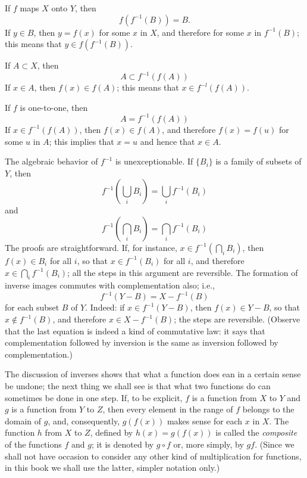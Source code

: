 If $f$ maps $X$ onto $Y$, then 
\begin{equation*} 
f(f^{-1}(B)) = B.
\end{equation*}
 If $y \in B$, then $y = f(x)$ for some $x$ in $X$, and therefore for some $x$ in $f^{-1}(B)$; this means that $y \in f(f^{-1}(B))$. 

If $A \subset X$, then 
\begin{equation*}
A \subset f^{-1}(f(A))
\end{equation*}
 If $x \in A$, then $f(x) \in f(A)$; this means that $x \in f^{-l}(f(A))$.

If $f$ is one-to-one, then 
\begin{equation*}
A = f^{-1}(f(A))
\end{equation*}
 If $x \in f^{-1}(f(A))$, then $f(x) \in f(A)$, and therefore $f(x) = f(u)$ for some $u$ in $A$; this implies that $x = u$ and hence that $x \in A$. 


The algebraic behavior of $f^{-1}$ is unexceptionable. If $ \{ B_{i} \} $ is a family of subsets of $Y$, then 
\begin{equation*}
f^{-1}( \bigcup_{i} B_{i} ) = \bigcup_{i}f^{-1}(B_{i})
\end{equation*}
and
\begin{equation*}
f^{-1}( \bigcap_{i} B_{i} ) = \bigcap_{i}f^{-1}(B_{i})
\end{equation*}
The proofs are straightforward. If, for instance, $x \in f^{-1}( \bigcap_{i} B_{i})$, then $f(x) \in B_{i}$ for all $i$, so that $x \in f^{-1}(B_{i})$ for all $i$, and therefore $x \in \bigcap_{i}f^{-1}(B_{i})$; all the steps in this argument are reversible. The formation of inverse images commutes with complementation also; i.e., 
\begin{equation*}
f^{-1}(Y - B) = X - f^{-1}(B)
\end{equation*}
for each subset $B$ of $Y$. Indeed: if $x \in f^{-1}(Y - B)$, then $f(x) \in Y - B$, so that $x \notin f^{-1}(B)$, and therefore $x \in X - f^{-1}(B)$; the steps are reversible. (Observe that the last equation is indeed a kind of commutative law: it says that complementation followed by inversion is the same as inversion followed by complementation.) 

The discussion of inverses shows that what a function does ean in a certain sense be undone; the next thing we shall see is that what two functions do can sometimes be done in one step. If, to be explicit, $f$ is a function from $X$ to $Y$ and $g$ is a function from $Y$ to $Z$, then every element in the range of $f$ belongs to the domain of $g$, and, consequently, $g(f(x))$ makes sense for each $x$ in $X$. The function $h$ from $X$ to $Z$, defined by $h(x) = g(f(x))$ is called the \textit{composite} of the functions $f$ and $g$; it is denoted by $g \circ f$ or, more simply, by $gf$. (Since we shall not have occasion to consider any other kind of multiplication for functions, in this book we shall use the latter, simpler notation only.) 

